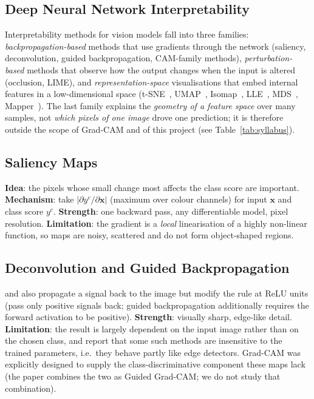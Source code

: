 \documentclass[11pt,a4paper]{article}
\newcommand{\GC}{Grad-CAM}
\begin{document}
\subsection{Deep Neural Network Interpretability}
Interpretability methods for vision models fall into three families: \emph{backpropagation-based} methods that use gradients through the network (saliency, deconvolution, guided backpropagation, CAM-family methods), \emph{perturbation-based} methods that observe how the output changes when the input is altered (occlusion, LIME), and \emph{representation-space} visualisations that embed internal features in a low-dimensional space (t-SNE~\citep{vandermaaten2008}, UMAP~\citep{mcinnes2018}, Isomap~\citep{tenenbaum2000}, LLE~\citep{roweis2000}, MDS~\citep{kruskal1964}, Mapper~\citep{singh2007}).
The last family explains the \emph{geometry of a feature space} over many samples, not \emph{which pixels of one image} drove one prediction; it is therefore outside the scope of \GC{} and of this project (see Table~\ref{tab:syllabus}).

\subsection{Saliency Maps}
\textbf{Idea}: the pixels whose small change most affects the class score are important. \textbf{Mechanism}: \citet{simonyan2014} take $|\partial y^c/\partial \bm{x}|$ (maximum over colour channels) for input $\bm{x}$ and class score $y^c$. \textbf{Strength}: one backward pass, any differentiable model, pixel resolution. \textbf{Limitation}: the gradient is a \emph{local} linearisation of a highly non-linear function, so maps are noisy, scattered and do not form object-shaped regions.

\subsection{Deconvolution and Guided Backpropagation}
\citet{zeiler2014} and \citet{springenberg2015} also propagate a signal back to the image but modify the rule at ReLU units (pass only positive signals back; guided backpropagation additionally requires the forward activation to be positive).
\textbf{Strength}: visually sharp, edge-like detail. \textbf{Limitation}: the result is largely dependent on the input image rather than on the chosen class, and \citet{adebayo2018} report that some such methods are insensitive to the trained parameters, i.e.\ they behave partly like edge detectors. \GC{} was explicitly designed to supply the class-discriminative component these maps lack (the paper combines the two as Guided Grad-CAM; we do not study that combination).
\end{document}
